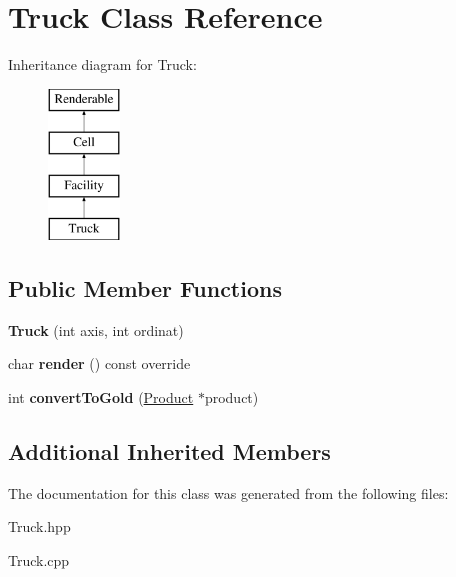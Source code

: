 \hypertarget{class_truck}{}\section{Truck Class Reference}
\label{class_truck}
Inheritance diagram for Truck\+:\begin{figure}[H]
\begin{center}
\leavevmode
\includegraphics[height=4.000000cm]{class_truck}
\end{center}
\end{figure}
\subsection*{Public Member Functions}
\begin{DoxyCompactItemize}
\item 
\mbox{\label{class_truck_a3fd8b3bcb4f67eaafacee47cf5bc2cbe}} 
{\bfseries Truck} (int axis, int ordinat)
\item 
\mbox{\label{class_truck_afd75ba37af1154ccf9cb12d44eb57c78}} 
char {\bfseries render} () const override
\item 
\mbox{\label{class_truck_ab269deefc4275d08b01fa6d16d3d8d61}} 
int {\bfseries convert\+To\+Gold} (\mbox{\hyperlink{class_product}{Product}} $\ast$product)
\end{DoxyCompactItemize}
\subsection*{Additional Inherited Members}


The documentation for this class was generated from the following files\+:\begin{DoxyCompactItemize}
\item 
Truck.\+hpp\item 
Truck.\+cpp\end{DoxyCompactItemize}
